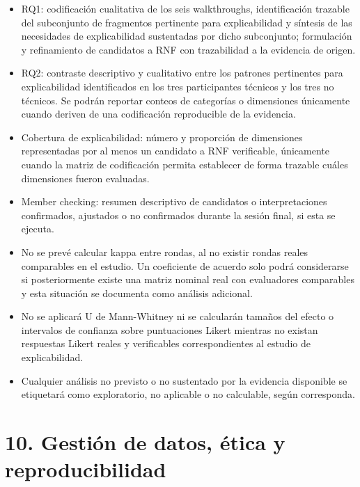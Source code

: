 \documentclass[9pt,a4paper]{extarticle}
\begin{document}
\begin{itemize}
\item RQ1: codificación cualitativa de los seis walkthroughs, identificación trazable del subconjunto de fragmentos pertinente para explicabilidad y síntesis de las necesidades de explicabilidad sustentadas por dicho subconjunto; formulación y refinamiento de candidatos a RNF con trazabilidad a la evidencia de origen.
\item RQ2: contraste descriptivo y cualitativo entre los patrones pertinentes para explicabilidad identificados en los tres participantes técnicos y los tres no técnicos. Se podrán reportar conteos de categorías o dimensiones únicamente cuando deriven de una codificación reproducible de la evidencia.
\item Cobertura de explicabilidad: número y proporción de dimensiones representadas por al menos un candidato a RNF verificable, únicamente cuando la matriz de codificación permita establecer de forma trazable cuáles dimensiones fueron evaluadas.
\item Member checking: resumen descriptivo de candidatos o interpretaciones confirmados, ajustados o no confirmados durante la sesión final, si esta se ejecuta.
\item No se prevé calcular kappa entre rondas, al no existir rondas reales comparables en el estudio. Un coeficiente de acuerdo solo podrá considerarse si posteriormente existe una matriz nominal real con evaluadores comparables y esta situación se documenta como análisis adicional.
\item No se aplicará U de Mann-Whitney ni se calcularán tamaños del efecto o intervalos de confianza sobre puntuaciones Likert mientras no existan respuestas Likert reales y verificables correspondientes al estudio de explicabilidad.
\item Cualquier análisis no previsto o no sustentado por la evidencia disponible se etiquetará como exploratorio, no aplicable o no calculable, según corresponda.
\end{itemize}

\clearpage
\section*{10. Gestión de datos, ética y reproducibilidad}
\end{document}
